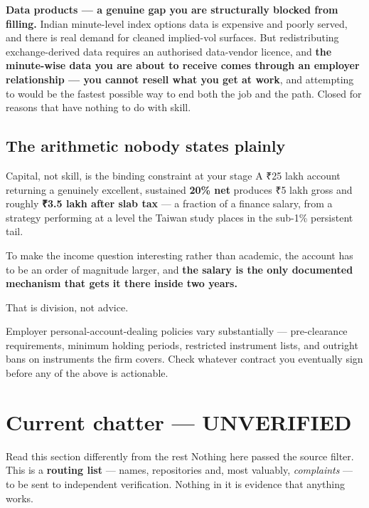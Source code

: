 \documentclass[11pt,a4paper]{article}
\newcommand{\rs}{₹}
\newcommand{\srcnote}[1]{{\footnotesize\color{soft}#1\par}}
\begin{document}
\textbf{Data products --- a genuine gap you are structurally blocked from filling.}
Indian minute-level index options data is expensive and poorly served, and there is
real demand for cleaned implied-vol surfaces. But redistributing exchange-derived
data requires an authorised data-vendor licence, and \textbf{the minute-wise data
you are about to receive comes through an employer relationship --- you cannot
resell what you get at work}, and attempting to would be the fastest possible way
to end both the job and the path. Closed for reasons that have nothing to do with skill.

\subsection{The arithmetic nobody states plainly}

\begin{keyfact}{Capital, not skill, is the binding constraint at your stage}
A \rs 25 lakh account returning a genuinely excellent, sustained \textbf{20\% net}
produces \rs 5 lakh gross and roughly \textbf{\rs 3.5 lakh after slab tax} --- a
fraction of a finance salary, from a strategy performing at a level the Taiwan
study places in the sub-1\% persistent tail.

To make the income question interesting rather than academic, the account has to be
an order of magnitude larger, and \textbf{the salary is the only documented
mechanism that gets it there inside two years.}

That is division, not advice.
\end{keyfact}

\srcnote{Employer personal-account-dealing policies vary substantially ---
pre-clearance requirements, minimum holding periods, restricted instrument lists,
and outright bans on instruments the firm covers. Check whatever contract you
eventually sign before any of the above is actionable.}

\newpage
\section{Current chatter --- UNVERIFIED}
\label{sec:chatter}

\begin{keyfact}{Read this section differently from the rest}
Nothing here passed the source filter. This is a \textbf{routing list} --- names,
repositories and, most valuably, \emph{complaints} --- to be sent to independent
verification. Nothing in it is evidence that anything works.
\end{keyfact}
\end{document}
